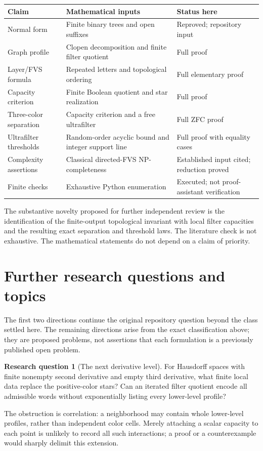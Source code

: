 \documentclass[11pt,letterpaper]{article}
\numberwithin{equation}{section}
\theoremstyle{definition}
\theoremstyle{remark}
\theoremstyle{definition}
\newtheorem{question}{Research question}
\begin{document}
\begin{center}
\begin{tabular}{@{}>{\raggedright\arraybackslash}p{}>{\raggedright\arraybackslash}p{}>{\raggedright\arraybackslash}p{}@{}}
\toprule
Claim&Mathematical inputs&Status here\\
\midrule
Normal form&Finite binary trees and open suffixes&Reproved; repository input\\
Graph profile&Clopen decomposition and finite filter quotient&Full proof\\
Layer/FVS formula&Repeated letters and topological ordering&Full elementary proof\\
Capacity criterion&Finite Boolean quotient and star realization&Full proof\\
Three-color separation&Capacity criterion and a free ultrafilter&Full ZFC proof\\
Ultrafilter thresholds&Random-order acyclic bound and integer support line&Full proof with equality cases\\
Complexity assertions&Classical directed-FVS NP-completeness&Established input cited; reduction proved\\
Finite checks&Exhaustive Python enumeration&Executed; not proof-assistant verification\\
\bottomrule
\end{tabular}
\end{center}

The substantive novelty proposed for further independent review is the
identification of the finite-output topological invariant with local filter
capacities and the resulting exact separation and threshold laws. The
literature check is not exhaustive. The mathematical statements do not
depend on a claim of priority.

\section{Further research questions and topics}
\label{fp:sec:questions}

The first two directions continue the original repository question beyond
the class settled here. The remaining directions arise from the exact
classification above; they are proposed problems, not assertions that each
formulation is a previously published open problem.

\begin{question}[The next derivative level]\label{fp:q:next-level}
For Hausdorff spaces with finite nonempty second derivative and empty third
derivative, what finite local data replace the positive-color stars?
Can an iterated filter quotient encode all admissible words without
exponentially listing every lower-level profile?
\end{question}
The obstruction is correlation: a neighborhood may contain whole lower-level
profiles, rather than independent color cells. Merely attaching a scalar
capacity to each point is unlikely to record all such interactions; a proof
or a counterexample would sharply delimit this extension.
\end{document}
